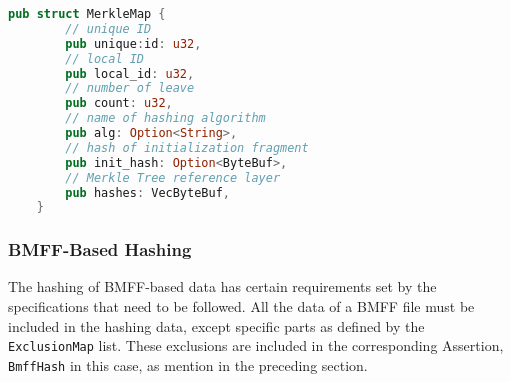 \begin{minipage}{0.95\linewidth}
\begin{lstlisting}[caption={MerkleMap Rust Definition}, label=code:merkle_map, language=Rust, captionpos=b]
    pub struct MerkleMap {
        // unique ID
        pub unique:id: u32,
        // local ID
        pub local_id: u32,
        // number of leave
        pub count: u32,
        // name of hashing algorithm
        pub alg: Option<String>,
        // hash of initialization fragment
        pub init_hash: Option<ByteBuf>,
        // Merkle Tree reference layer
        pub hashes: VecByteBuf,
    }
\end{lstlisting}
\end{minipage}

\subsubsection{BMFF-Based Hashing\label{sec:bmff_hashing}}

The hashing of BMFF-based data has certain requirements set by the specifications that need to be followed. All the data of a BMFF file must be included in the hashing data, except specific parts as defined by the \texttt{ExclusionMap} list. These exclusions are included in the corresponding Assertion, \texttt{BmffHash} in this case, as mention in the preceding section.


